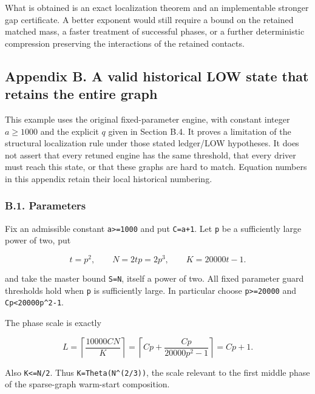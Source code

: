 What is obtained is an exact localization theorem and an implementable stronger gap certificate. A better exponent would still require a bound on the retained matched mass, a faster treatment of successful phases, or a further deterministic compression preserving the interactions of the retained contacts.

\hypertarget{af-f687f276ee-appendix-b.-a-valid-historical-low-state-that-retains-the-entire-graph}{%
\subsection{Appendix B. A valid historical LOW state that retains the entire graph}\label{af-f687f276ee-appendix-b.-a-valid-historical-low-state-that-retains-the-entire-graph}}

This example uses the original fixed-parameter engine, with constant integer \(a≥1000\) and the explicit \(q\) given in Section B.4. It proves a limitation of the structural localization rule under those stated ledger/LOW hypotheses. It does not assert that every retuned engine has the same threshold, that every driver must reach this state, or that these graphs are hard to match. Equation numbers in this appendix retain their local historical numbering.

\hypertarget{af-f687f276ee-b.1.-parameters}{%
\subsubsection{B.1. Parameters}\label{af-f687f276ee-b.1.-parameters}}

Fix an admissible constant \texttt{a\textgreater{}=1000} and put \texttt{C=a+1}. Let \texttt{p} be a sufficiently large power of two, put

\[
t=p^2,\qquad N=2tp=2p^3,\qquad K=20000t-1.
\]

and take the master bound \texttt{S=N}, itself a power of two. All fixed parameter guard thresholds hold when \texttt{p} is sufficiently large. In particular choose \texttt{p\textgreater{}=20000} and \texttt{Cp\textless{}20000p\^{}2-1}.

The phase scale is exactly

\[
L=\left\lceil\frac{10000CN}{K}\right\rceil=\left\lceil Cp+\frac{Cp}{20000p^2-1}\right\rceil=Cp+1.\tag{1}
\]

Also \texttt{K\textless{}=N/2}. Thus \texttt{K=Theta(N\^{}(2/3))}, the scale relevant to the first middle phase of the sparse-graph warm-start composition.

